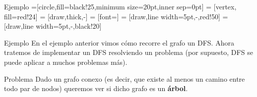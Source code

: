\documentclass[compress]{beamer}
\begin{document}
\begin{frame}{Ejemplo}
=[circle,fill=black!25,minimum size=20pt,inner sep=0pt]
 = [vertex, fill=red!24]
 = [draw,thick,-]
 = [font=\small]
 = [draw,line width=5pt,-,red!50]
 = [draw,line width=5pt,-,black!20]

\begin{figure}
\end{figure}
\end{frame}


\begin{frame}{Ejemplo}
En el ejemplo anterior vimos cómo recorre el grafo un DFS. Ahora tratemos de implementar un DFS resolviendo un problema (por supuesto, DFS se puede aplicar a muchos problemas más).

\begin{block}{Problema}
Dado un grafo conexo (es decir, que existe al menos un camino entre todo par de nodos) queremos ver si dicho grafo es un {\bf árbol}.
\end{block}
\end{frame}
\end{document}
